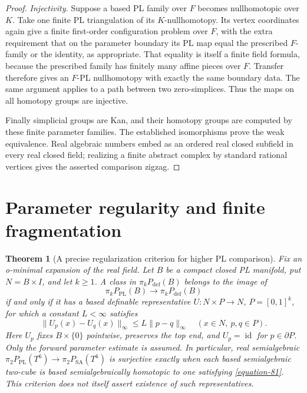 \documentclass[11pt,a4paper]{article}
\newtheorem{theorem}{Theorem}[section]
\theoremstyle{definition}
\begin{document}
\begin{proof}
\emph{Injectivity.}
Suppose a based PL family over $F$ becomes nullhomotopic over
$K$. Take one finite PL triangulation of its $K$-nullhomotopy.
Its vertex coordinates again give a finite first-order
configuration problem over $F$, with the extra requirement that
on the parameter boundary its PL map equal the prescribed
$F$-family or the identity, as appropriate. That equality is
itself a finite field formula, because the prescribed family
has finitely many affine pieces over $F$. Transfer therefore
gives an $F$-PL nullhomotopy with exactly the same boundary data.
The same argument applies to a path between two zero-simplices.
Thus the maps on all homotopy groups are injective.

Finally simplicial groups are Kan, and their homotopy groups
are computed by these finite parameter families. The established
isomorphisms prove the weak equivalence. Real algebraic numbers
embed as an ordered real closed subfield in every real closed
field; realizing a finite abstract complex by standard rational
vertices gives the asserted comparison zigzag.
\end{proof}\section{Parameter regularity and finite fragmentation}
\begin{theorem}[A precise regularization criterion for higher PL comparison]\label{result-41}
Fix an o-minimal expansion of the real field. Let \(B\) be a compact
closed PL manifold, put \(N=B\times I\), and let \(k\geq1\).
A class in \(\pi_kP_{\mathrm{def}}(B)\) belongs to the image of
\begin{equation}
 \pi_kP_{\mathrm{PL}}(B)\longrightarrow\pi_kP_{\mathrm{def}}(B)
 \label{equation-80}
\end{equation}
if and only if it has a based definable representative
\(U:N\times P\to N\), \(P=[0,1]^k\), for which a constant \(L<\infty\)
satisfies
\begin{equation}
 \|U_p(x)-U_q(x)\|_\infty\leq L\|p-q\|_\infty
 \quad(x\in N,\ p,q\in P).
 \label{equation-81}
\end{equation}
Here \(U_p\) fixes \(B\times\{0\}\) pointwise, preserves the top end,
and \(U_p=\operatorname{id}\) for \(p\in\partial P\).
Only the forward parameter estimate is assumed.
In particular, real semialgebraic
\(\pi_2P_{\mathrm{PL}}(T^6)\to\pi_2P_{\mathrm{SA}}(T^6)\)
is surjective exactly when each based semialgebraic two-cube is based
semialgebraically homotopic to one satisfying \eqref{equation-81}.
This criterion does not itself assert existence of such representatives.
\end{theorem}
\end{document}
